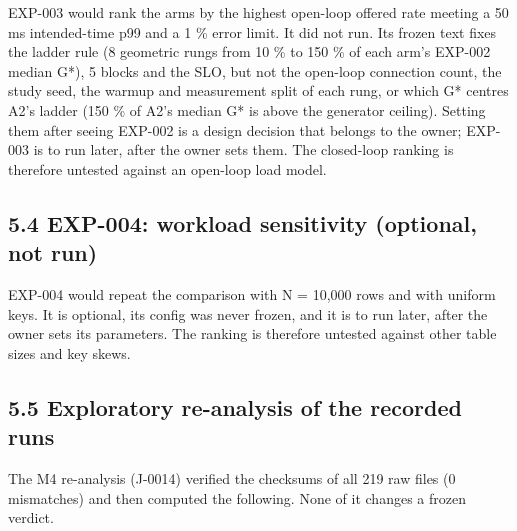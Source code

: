 \documentclass[
]{article}
\begin{document}
EXP-003 would rank the arms by the highest open-loop offered rate
meeting a 50 ms intended-time p99 and a 1 \% error limit. It did not
run. Its frozen text fixes the ladder rule (8 geometric rungs from 10 \%
to 150 \% of each arm's EXP-002 median G*), 5 blocks and the SLO, but
not the open-loop connection count, the study seed, the warmup and
measurement split of each rung, or which G* centres A2's ladder (150 \%
of A2's median G* is above the generator ceiling). Setting them after
seeing EXP-002 is a design decision that belongs to the owner; EXP-003
is to run later, after the owner sets them. The closed-loop ranking is
therefore untested against an open-loop load model.

\subsection{5.4 EXP-004: workload sensitivity (optional, not
run)}\label{exp-004-workload-sensitivity-optional-not-run}

EXP-004 would repeat the comparison with N = 10,000 rows and with
uniform keys. It is optional, its config was never frozen, and it is to
run later, after the owner sets its parameters. The ranking is therefore
untested against other table sizes and key skews.

\subsection{5.5 Exploratory re-analysis of the recorded
runs}\label{exploratory-re-analysis-of-the-recorded-runs}

The M4 re-analysis (J-0014) verified the checksums of all 219 raw files
(0 mismatches) and then computed the following. None of it changes a
frozen verdict.
\end{document}
